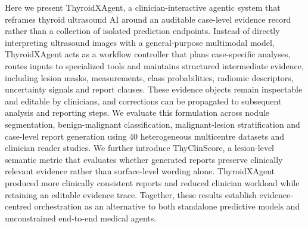 \documentclass[fleqn,10pt]{wlscirep}
\begin{document}
Here we present ThyroidXAgent, a clinician-interactive agentic system that reframes thyroid ultrasound AI around an auditable case-level evidence record rather than a collection of isolated prediction endpoints. Instead of directly interpreting ultrasound images with a general-purpose multimodal model, ThyroidXAgent acts as a workflow controller that plans case-specific analyses, routes inputs to specialized tools and maintains structured intermediate evidence, including lesion masks, measurements, class probabilities, radiomic descriptors, uncertainty signals and report clauses. These evidence objects remain inspectable and editable by clinicians, and corrections can be propagated to subsequent analysis and reporting steps. We evaluate this formulation across nodule segmentation, benign-malignant classification, malignant-lesion stratification and case-level report generation using 40 heterogeneous multicentre datasets and clinician reader studies. We further introduce ThyClinScore, a lesion-level semantic metric that evaluates whether generated reports preserve clinically relevant evidence rather than surface-level wording alone. ThyroidXAgent produced more clinically consistent reports and reduced clinician workload while retaining an editable evidence trace. Together, these results establish evidence-centred orchestration as an alternative to both standalone predictive models and unconstrained end-to-end medical agents.
\end{document}

